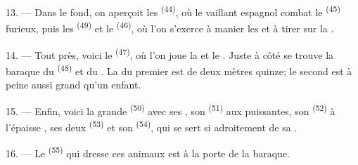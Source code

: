 13. --- Dans le fond, on aperçoit les  \textsuperscript{(44)},
où le vaillant  espagnol combat le 
\textsuperscript{(45)} furieux, puis les 
\textsuperscript{(49)} et le  \textsuperscript{(46)}, où
l'on s'exerce à manier les  et à tirer sur la .

14. --- Tout près, voici le  \textsuperscript{(47)}, où
l'on joue la  et le . Juste à côté se trouve la
baraque du  \textsuperscript{(48)} et du . La
 du premier est de deux mètres quinze; le second est à peine
aussi grand qu'un enfant.

15. --- Enfin, voici la grande  \textsuperscript{(50)} avec
ses , son  \textsuperscript{(51)} aux
 puissantes, son  \textsuperscript{(52)} à
l'épaisse , ses deux  \textsuperscript{(53)}
et son  \textsuperscript{(54)}, qui se sert si adroitement de
sa .

16. --- Le  \textsuperscript{(55)} qui dresse ces animaux est
à la porte de la baraque.
\VUsaut{6.0mm}
\VUfilet{22mm}
